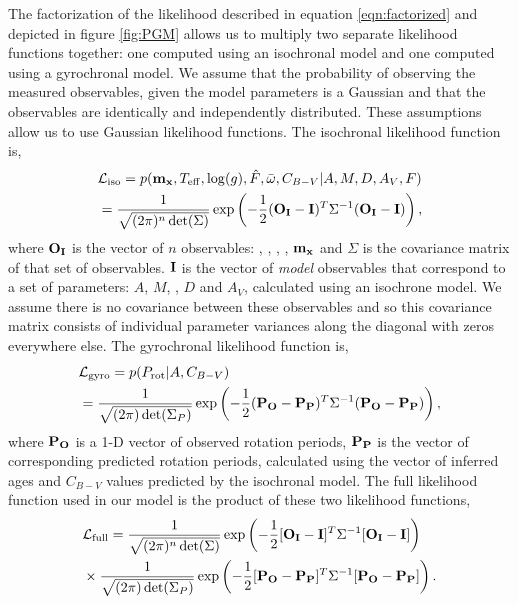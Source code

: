 The factorization of the likelihood described in equation \ref{eqn:factorized}
and depicted in figure \ref{fig:PGM} allows us to multiply two separate
likelihood functions together: one computed using an isochronal model and one
computed using a gyrochronal model.
We assume that the probability of observing the measured observables, given
the model parameters is a Gaussian and that the observables are identically
and independently distributed.
These assumptions allow us to use Gaussian likelihood functions.
The isochronal likelihood function is,
\begin{eqnarray}
    & \mathcal{L_{\mathrm{iso}}} = p({\bf m_x}, T_{\mathrm{eff}}, \log(g),
    \hat{F},
    \bar{\omega}, C_{B-V}|A, M, D,
    A_V, F) \\ \nonumber
    & = \frac{1}{\sqrt{(2\pi)^n \det(\Sigma)}}
    \exp\left( -\frac{1}{2} ({\bf O_I} - {\bf I})^T \Sigma ^{-1}
    ({\bf O_I} - {\bf I})\right),
\label{eqn:iso_likelihood}
\end{eqnarray}
where ${\bf O_I}$ is the vector of $n$ observables: \teff, \logg, \fhat,
\pmega, ${\bf m_x}$ and $\Sigma$ is the covariance matrix of that set of
observables.
${\bf I}$ is the vector of {\it model} observables that correspond to a set of
parameters: $A$, $M$, \feh, $D$ and $A_V$, calculated using an isochrone model.
We assume there is no covariance between these observables and so this
covariance matrix consists of individual parameter variances along the
diagonal with zeros everywhere else.
The gyrochronal likelihood function is,
\begin{eqnarray}
    & \mathcal{L_{\mathrm{gyro}}} = p(P_\mathrm{rot} |A, C_{B-V}) \\ \nonumber
    & = \frac{1}{\sqrt{(2\pi) \det(\Sigma_P)}}
    \exp\left( -\frac{1}{2} ({\bf P_O} - {\bf P_P})^T \Sigma ^{-1}
    ({\bf P_O} - {\bf P_P})\right),
\label{eqn:gyro_likelihood}
\end{eqnarray}
where ${\bf P_O}$ is a 1-D vector of observed rotation periods, ${\bf P_P}$ is
the vector of corresponding predicted rotation periods, calculated using the
vector of inferred ages and $C_{B-V}$ values predicted by the isochronal
model.
The full likelihood function used in our model is the product of these two
likelihood functions,
\begin{eqnarray}
    & \mathcal{L_{\mathrm{full}}} = \frac{1}{\sqrt{(2\pi)^n \det(\Sigma)}}
    \exp\left( -\frac{1}{2} [{\bf O_I} - {\bf I}]^T \Sigma ^{-1}
    [{\bf O_I} - {\bf I}]\right) \\ \nonumber
    & \times
    \frac{1}{\sqrt{(2\pi) \det(\Sigma_P)}}
    \exp\left( -\frac{1}{2} [{\bf P_O} - {\bf P_P}]^T \Sigma ^{-1}
    [{\bf P_O} - {\bf P_P}]\right).
\label{eqn:full_likelihood}
\end{eqnarray}

